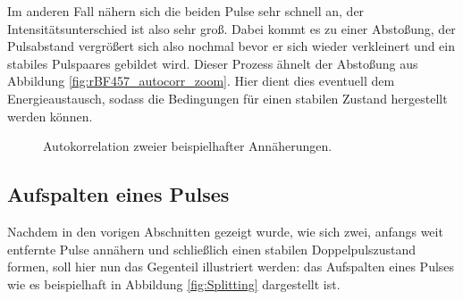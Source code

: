 \documentclass[bachelor,       %
               twoside,        %
               BCOR10mm,       %
               liststotoc,nomtotoc,bibtotoc, %
               english,ngerman, %
               final,          %
               ]{GAUBM}
\begin{document}
Im anderen Fall nähern sich die beiden Pulse sehr schnell an, der Intensitätsunterschied ist also sehr groß.
Dabei kommt es zu einer Abstoßung, der Pulsabstand vergrößert sich also nochmal bevor er sich wieder verkleinert und ein stabiles Pulspaares gebildet wird.
Dieser Prozess ähnelt der Abstoßung aus Abbildung \ref{fig:rBF457_autocorr_zoom}.
Hier dient dies eventuell dem Energieaustausch, sodass die Bedingungen für einen stabilen Zustand hergestellt werden können.
\begin{figure}[!htb]
   \centering
   \hfill
   \caption{Autokorrelation zweier beispielhafter Annäherungen.}
   \label{fig:StartAnnaehrung2}
\end{figure}

\clearpage
\subsection{Aufspalten eines Pulses}
Nachdem in den vorigen Abschnitten gezeigt wurde, wie sich zwei, anfangs weit entfernte Pulse annähern und schließlich einen stabilen Doppelpulszustand formen, soll hier nun das Gegenteil illustriert werden: das Aufspalten eines Pulses wie es beispielhaft in Abbildung \ref{fig:Splitting} dargestellt ist.
\end{document}
